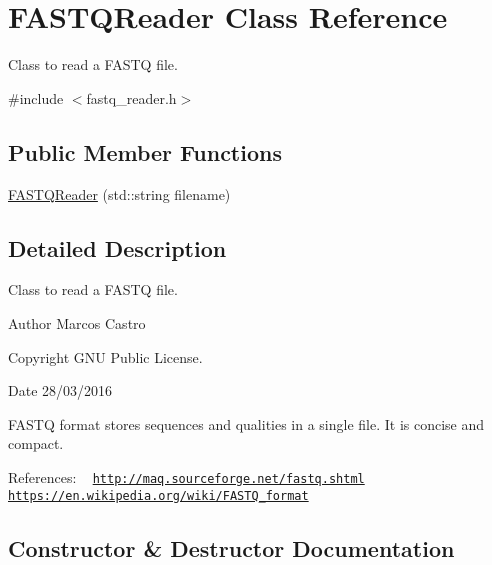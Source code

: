 \hypertarget{class_f_a_s_t_q_reader}{}\section{F\+A\+S\+T\+Q\+Reader Class Reference}
\label{class_f_a_s_t_q_reader}


Class to read a F\+A\+S\+TQ file.  




{\ttfamily \#include $<$fastq\+\_\+reader.\+h$>$}

\subsection*{Public Member Functions}
\begin{DoxyCompactItemize}
\item 
\hyperlink{class_f_a_s_t_q_reader_a8aa8970e4a6d49eb96bc425ea6f4d05b}{F\+A\+S\+T\+Q\+Reader} (std\+::string filename)
\end{DoxyCompactItemize}


\subsection{Detailed Description}
Class to read a F\+A\+S\+TQ file. 

\begin{DoxyAuthor}{Author}
Marcos Castro 
\end{DoxyAuthor}
\begin{DoxyCopyright}{Copyright}
G\+NU Public License. 
\end{DoxyCopyright}
\begin{DoxyDate}{Date}
28/03/2016
\end{DoxyDate}
F\+A\+S\+TQ format stores sequences and qualities in a single file. It is concise and compact.

References\+: ~\newline
 \href{http://maq.sourceforge.net/fastq.shtml}{\tt http\+://maq.\+sourceforge.\+net/fastq.\+shtml} ~\newline
 \href{https://en.wikipedia.org/wiki/FASTQ_format}{\tt https\+://en.\+wikipedia.\+org/wiki/\+F\+A\+S\+T\+Q\+\_\+format} 

\subsection{Constructor \& Destructor Documentation}

